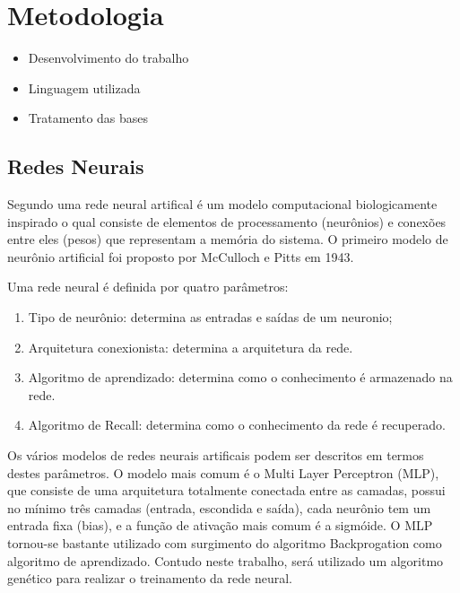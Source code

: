 \documentclass[12pt]{article}
\begin{document}
\section{Metodologia} \label{sec:metodologia}

\begin{itemize}
\item Desenvolvimento do trabalho
\item Linguagem utilizada
\item Tratamento das bases
\end{itemize}

\subsection{Redes Neurais}

\par Segundo \cite{kasabov} uma rede neural artifical é um modelo computacional biologicamente inspirado o qual consiste de elementos de processamento (neurônios) e conexões entre eles (pesos) que representam a memória do sistema. O primeiro modelo de neurônio artificial foi proposto por McCulloch e Pitts em 1943. 
\par Uma rede neural é definida por quatro parâmetros:

\begin{enumerate}
	\item Tipo de neurônio: determina as entradas e saídas de um neuronio;
	\item Arquitetura conexionista: determina a arquitetura da rede.
	\item Algoritmo de aprendizado: determina como o conhecimento é armazenado na rede.
	\item Algoritmo de Recall: determina como o conhecimento da rede é recuperado.
\end{enumerate}

\par Os vários modelos de redes neurais artificais podem ser descritos em termos destes parâmetros. O modelo mais comum é o Multi Layer Perceptron (MLP), que consiste de uma arquitetura totalmente conectada entre as camadas, possui no mínimo três camadas (entrada, escondida e saída), cada neurônio tem um entrada fixa (bias), e a função de ativação mais comum é a sigmóide. O MLP tornou-se bastante utilizado com surgimento do algoritmo Backprogation como algoritmo de aprendizado. Contudo neste trabalho, será utilizado um algoritmo genético para realizar o treinamento da rede neural.
\end{document}
